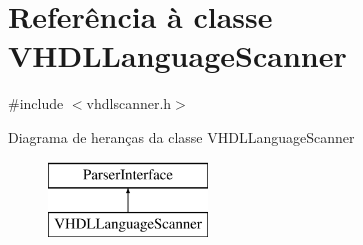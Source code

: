 \hypertarget{class_v_h_d_l_language_scanner}{\section{Referência à classe V\-H\-D\-L\-Language\-Scanner}
\label{class_v_h_d_l_language_scanner}
}


{\ttfamily \#include $<$vhdlscanner.\-h$>$}

Diagrama de heranças da classe V\-H\-D\-L\-Language\-Scanner\begin{figure}[H]
\begin{center}
\leavevmode
\includegraphics[height=2.000000cm]{class_v_h_d_l_language_scanner}
\end{center}
\end{figure}
